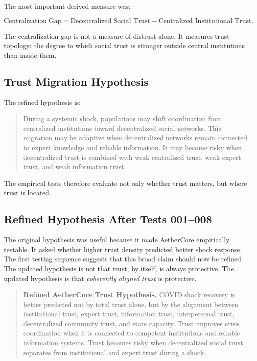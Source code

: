 \documentclass[12pt]{article}
\begin{document}
The most important derived measure was:

\[
\text{Centralization Gap} =
\text{Decentralized Social Trust} -
\text{Centralized Institutional Trust}.
\]

The centralization gap is not a measure of distrust alone. It measures trust topology: the degree to which social trust is stronger outside central institutions than inside them.

\subsection{Trust Migration Hypothesis}

The refined hypothesis is:

\begin{quote}
During a systemic shock, populations may shift coordination from centralized institutions toward decentralized social networks. This migration may be adaptive when decentralized networks remain connected to expert knowledge and reliable information. It may become risky when decentralized trust is combined with weak centralized trust, weak expert trust, and weak information trust.
\end{quote}

The empirical tests therefore evaluate not only whether trust matters, but where trust is located.

\subsection{Refined Hypothesis After Tests 001--008}

The original hypothesis was useful because it made AetherCore empirically testable. It asked whether higher trust density predicted better shock response. The first testing sequence suggests that this broad claim should now be refined. The updated hypothesis is not that trust, by itself, is always protective. The updated hypothesis is that \textit{coherently aligned trust} is protective.

\begin{quote}
\textbf{Refined AetherCore Trust Hypothesis.} COVID shock recovery is better predicted not by total trust alone, but by the alignment between institutional trust, expert trust, information trust, interpersonal trust, decentralized community trust, and state capacity. Trust improves crisis coordination when it is connected to competent institutions and reliable information systems. Trust becomes risky when decentralized social trust separates from institutional and expert trust during a shock.
\end{quote}
\end{document}
